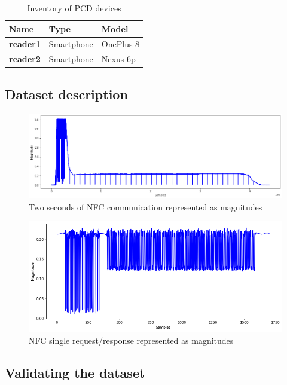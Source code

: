 \begin{table}[h!]
  \centering
  \begin{tabular}{|l|l|l|}
    \hline
    \textbf{Name}    & \textbf{Type} & \textbf{Model} \\ \hline
    \textbf{reader1} & Smartphone    & OnePlus 8      \\ \hline
    \textbf{reader2} & Smartphone    & Nexus 6p       \\ \hline
  \end{tabular}
  \caption{Inventory of PCD devices}
  \label{tab:pcd-inventory}
\end{table}

\subsection{Dataset description}

\begin{figure}[htp!]
  \centering
  \includegraphics[scale=0.47]{figures/data_whole-transmission.png}
  \caption{Two seconds of NFC communication represented as magnitudes}
  \label{fig:nfc-full}
\end{figure}

\begin{figure}[htp!]
  \centering
  \includegraphics[scale=0.6]{figures/data_single-request-response.png}
  \caption{NFC single request/response represented as magnitudes}
  \label{fig:nfc-single}
\end{figure}

\subsection{Validating the dataset}
